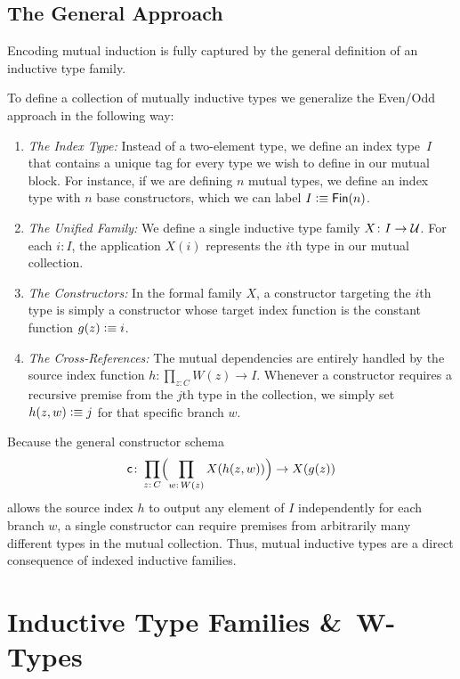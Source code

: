\subsection*{The General Approach}
Encoding mutual induction is fully captured by the general definition of an inductive type family.

To define a collection of mutually inductive types we  generalize the Even/Odd approach in the following way:

\begin{enumerate}
    \item \textit{The Index Type:} Instead of a two-element type, we define an index type~$I$ that contains a unique tag for every type we wish to define in our mutual block. For instance, if we are defining $n$ mutual types, we define an index type with $n$ base constructors, which we can label $I\mathrel{\vcentcolon}\equiv\mathsf{Fin}(n)$. 
    
    \item \textit{The Unified Family:} We define a single inductive type family $X\colon I\to\univ$. For each $i\colon I$, the application $X(i)$ represents the $i$th type in our mutual collection.
    
    \item \textit{The Constructors:} In the formal family $X$, a constructor targeting the $i$th type is simply a constructor whose target index function is the constant function $g(z)\mathrel{\vcentcolon}\equiv i$. 
    
    \item \textit{The Cross-References:} The mutual dependencies are entirely handled by the source index function $h\colon\prod_{z\colon C}W(z)\to I$. Whenever a constructor requires a recursive premise from the $j$th type in the collection, we simply set $h(z,w)\mathrel{\vcentcolon}\equiv j$ for that specific branch $w$.
\end{enumerate}

Because the general constructor schema
\[
    \fun c\colon\prod_{z\colon C}
        \Bigl(
            \prod_{w\colon W(z)}X(h(z,w))
        \Bigr)
        \to X(g(z))
\]
allows the source index $h$ to output any element of $I$ independently for each branch $w$, a single constructor can require premises from arbitrarily many different types in the mutual collection. Thus, mutual inductive types are a direct consequence of indexed inductive families.

\section{Inductive Type Families \texorpdfstring{\&}{and}\ {\normalfont\textsf W}-Types}

